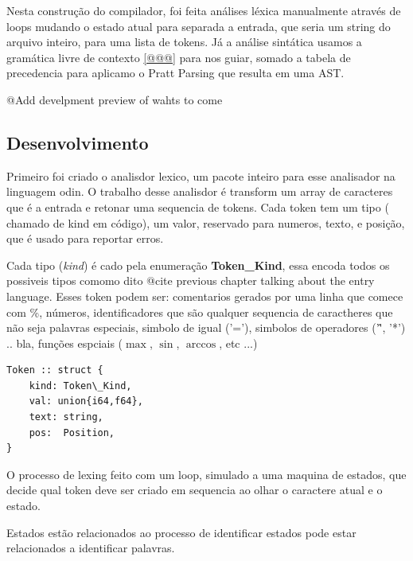 Nesta construção do compilador, foi feita análises léxica manualmente através de loops mudando o estado atual para separada a entrada, que seria um string do arquivo inteiro, para uma lista de tokens. Já a análise sintática usamos a gramática livre de contexto \autoref{@@@} para nos guiar, somado a tabela de precedencia para aplicamo o Pratt Parsing que resulta em uma AST.

%
%

@{Add develpment preview of wahts to come}
\subsection{Desenvolvimento}

Primeiro foi criado o analisdor lexico, um pacote inteiro para esse analisador na linguagem odin.
O trabalho desse analisdor é transform um array de caracteres que é a entrada e retonar uma sequencia de tokens.
Cada token tem um tipo ( chamado de kind em código), um valor, reservado para numeros, texto, e posição, que é usado para reportar erros.

Cada tipo (\textit{kind}) é cado pela enumeração \textbf{Token\_Kind}, essa encoda todos os possiveis tipos comomo dito @{cite previous chapter talking about the entry language}.
Esses token podem ser: comentarios gerados por uma linha que comece com \%, números, identificadores que são qualquer sequencia de caractheres que não seja palavras especiais, simbolo de igual ('='), simbolos de operadores ('\^', '*') .. bla, funções espciais ($\max$, $\sin$, $\arccos$, etc ...)


\begin{codigo}[H]
  \caption{\small } \label{}
\begin{lstlisting}
Token :: struct {
    kind: Token\_Kind,
    val: union{i64,f64},
    text: string,
    pos:  Position,
}

\end{lstlisting}
\end{codigo}

O processo de lexing feito com um loop, simulado a uma maquina de estados, que decide qual token deve ser criado em sequencia ao olhar o caractere atual e o estado.

Estados estão relacionados ao processo de identificar estados pode estar relacionados a identificar palavras.

